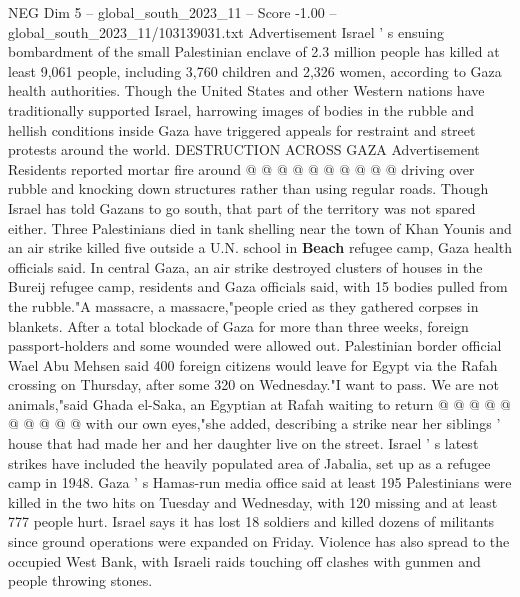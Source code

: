 \begin{textsample}{NEG Dim 5 – global\_south\_2023\_11 – Score -1.00 – global\_south\_2023\_11/103139031.txt}
Advertisement Israel ' s ensuing bombardment of the small Palestinian enclave of 2.3 million people has killed at least 9,061 people, including 3,760 children and 2,326 women, according to Gaza health authorities.
Though the United States and other Western nations have traditionally supported Israel, harrowing images of bodies in the rubble and hellish conditions inside Gaza have triggered appeals for restraint and street protests around the world.
DESTRUCTION ACROSS GAZA Advertisement Residents reported mortar fire around @ @ @ @ @ @ @ @ @ @ driving over rubble and knocking down structures rather than using regular roads.
Though Israel has told Gazans to go south, that part of the territory was not spared either.
Three Palestinians died in tank shelling near the town of Khan Younis and an air strike killed five outside a U.N. school in \textbf{Beach} refugee camp, Gaza health officials said.
In central Gaza, an air strike destroyed clusters of houses in the Bureij refugee camp, residents and Gaza officials said, with 15 bodies pulled from the rubble."A massacre, a massacre,"people cried as they gathered corpses in blankets.
After a total blockade of Gaza for more than three weeks, foreign passport-holders and some wounded were allowed out.
Palestinian border official Wael Abu Mehsen said 400 foreign citizens would leave for Egypt via the Rafah crossing on Thursday, after some 320 on Wednesday."I want to pass.
We are not animals,"said Ghada el-Saka, an Egyptian at Rafah waiting to return @ @ @ @ @ @ @ @ @ @ with our own eyes,"she added, describing a strike near her siblings ' house that had made her and her daughter live on the street.
Israel ' s latest strikes have included the heavily populated area of Jabalia, set up as a refugee camp in 1948.
Gaza ' s Hamas-run media office said at least 195 Palestinians were killed in the two hits on Tuesday and Wednesday, with 120 missing and at least 777 people hurt.
Israel says it has lost 18 soldiers and killed dozens of militants since ground operations were expanded on Friday.
Violence has also spread to the occupied West Bank, with Israeli raids touching off clashes with gunmen and people throwing stones.

\end{textsample}
